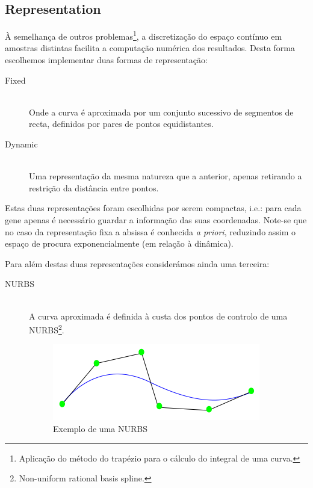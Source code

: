 \documentclass[a4paper]{article}
\begin{document}
\subsection{Representation}
\indent \indent À semelhança de outros problemas\footnote[1]{Aplicação do método do trapézio para o cálculo do integral de uma curva.}, a discretização do espaço contínuo em amostras
distintas facilita a computação numérica dos resultados. Desta forma escolhemos implementar duas formas de representação:

\begin{description}
	\item[Fixed] \hfill \\ 
		Onde a curva é aproximada por um conjunto sucessivo de segmentos de recta, definidos por pares de pontos equidistantes.
	\item[Dynamic] \hfill \\ 
		Uma representação da mesma natureza que a anterior, apenas retirando a restrição da distância entre pontos.
\end{description}

\indent Estas duas representações foram escolhidas por serem compactas, i.e.: para cada gene apenas é necessário guardar a informação das suas coordenadas.
Note-se que no caso da representação fixa a absissa é conhecida \emph{a priori}, reduzindo assim o espaço de procura exponencialmente (em relação à dinâmica).

\indent Para além destas duas representações considerámos ainda uma terceira:

\begin{description}
	\item[NURBS] \hfill \\ 
		A curva aproximada é definida à custa dos pontos de controlo de uma NURBS\footnote[2]{Non-uniform rational basis spline.}. 
		\begin{figure}[ht]
			\centering
			\includegraphics[scale=0.50]{images/NURBstatic.png}
			\caption{Exemplo de uma NURBS}
			\label{fig:nurbs}
		\end{figure}
\end{description}
\end{document}
